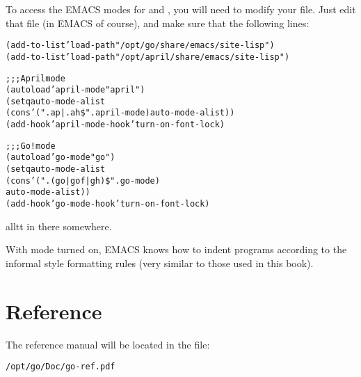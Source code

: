 To access the EMACS modes for \go and \april, you will need to modify your  file. Just edit that file (in EMACS of course), and make sure that the following lines:
\begin{alltt}
(add-to-list 'load-path "/opt/go/share/emacs/site-lisp")
(add-to-list 'load-path "/opt/april/share/emacs/site-lisp")

;;; April mode
(autoload 'april-mode "april")
(setq auto-mode-alist 
  (cons '("\bsl\bsl.ap\bsl\bsl{}|.ah\$" . april-mode) auto-mode-alist))
(add-hook 'april-mode-hook 'turn-on-font-lock)

;;; Go! mode
(autoload 'go-mode "go")
(setq auto-mode-alist 
  (cons '("\bsl\bsl.\bsl\bsl(go\bsl\bsl|gof\bsl\bsl|gh\bsl\bsl)\$" . go-mode) 
    auto-mode-alist))
(add-hook 'go-mode-hook 'turn-on-font-lock)
\end{alltt}
alltt in there somewhere.

With \go mode turned on, EMACS knows how to indent \go programs according to the informal style formatting rules (very similar to those used in this book).

\section{\go Reference}
The \go reference manual will be located in the file:
\begin{alltt}
/opt/go/Doc/go-ref.pdf
\end{alltt}


